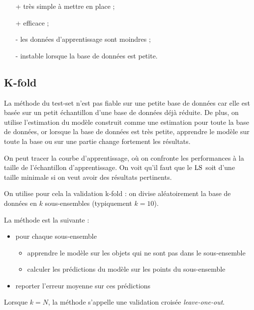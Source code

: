 	\begin{itemize}
		\item[+] très simple à mettre en place ;
		\item[+] efficace ;
		\item[-] les données d'apprentissage sont moindres ;
		\item[-] instable lorsque la base de données est petite.
	\end{itemize}
	
	
	\subsection{K-fold}
	
	La méthode du test-set n'est pas fiable sur une petite base de données car elle est basée sur un petit échantillon d'une base de données déjà réduite. De plus, on utilise l'estimation du modèle construit comme une estimation pour toute la base de données, or lorsque la base de données est très petite, apprendre le modèle sur toute la base ou sur une partie change fortement les résultats.
	
	On peut tracer la courbe d'apprentissage, où on confronte les performances à la taille de l'échantillon d'apprentissage. On voit qu'il faut que le $\text{LS}$ soit d'une taille minimale si on veut avoir des résultats pertinents.
	
	
	On utilise pour cela la validation k-fold : on divise aléatoirement la base de données en $k$ sous-ensembles (typiquement $k = 10$).
	
	
	La méthode est la suivante :
	
	\begin{itemize}
		\item pour chaque sous-ensemble
		\begin{itemize}
			\item apprendre le modèle sur les objets qui ne sont pas dans le sous-ensemble
			\item calculer les prédictions du modèle sur les points du sous-ensemble
		\end{itemize}
		\item reporter l'erreur moyenne sur ces prédictions
	\end{itemize}
	
	Lorsque $k = N$, la méthode s'appelle une validation croisée \textit{leave-one-out}.
	
